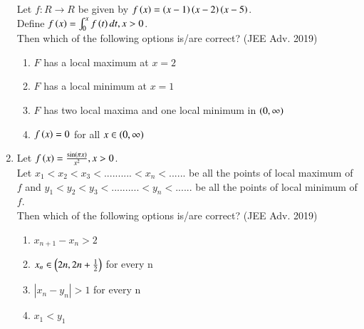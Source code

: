 \documentclass[journal]{IEEEtran}
\begin{document}
\begin{enumerate}
{            Let $f: R\rightarrow R$ be given by $f\left(x\right) = \left(x-1\right)\left(x-2\right)\left(x-5\right)$.\\[6pt] 
            Define $f\left(x\right) = \int_0^x f\left(t\right)dt, x>0$.\\[3pt]
            Then which of the following options is/are correct?
             \hfill
                {(JEE Adv. 2019)}
            
            \begin{enumerate}
                \item $F$ has a local maximum at $x=2$
                \item $F$ has a local minimum at $x=1$
                \item $F$ has two local maxima and one local minimum in $\left(0,\infty\right)$
                \item $f\left(x\right) = 0$ for all $x \in \left(0,\infty\right)$
            \end{enumerate}
        
        }
        
    \item{
        
            Let $f\left(x\right) = \frac{\sin\left(\pi x\right)}{x^2}, x>0$.\\[3pt]
            Let $x_1 < x_2 < x_3 < .......... <x_n <......$ be all the points of local maximum of $f$ and $y_1 < y_2 < y_3 < .......... <y_n <......$ be all the points of local minimum of $f$.\\
            Then which of the following options is/are correct?
             \hfill
                {(JEE Adv. 2019)}
            
            \begin{multicols}{2}
                \begin{enumerate}
                    \item $x_{n+1} - x_{n} > 2$ 
                    \item $x_{n} \in \left(2n, 2n+\frac{1}{2}\right)$ for every n
                    \item $|x_{n} - y_{n}|> 1 $ for every n
                    \item $x_{1} < y_{1}$
                \end{enumerate}
            \end{multicols}
        
        }
    \end{enumerate}
\end{document}
